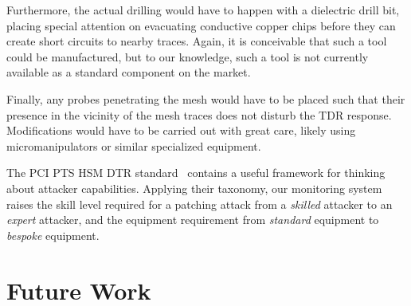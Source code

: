 \documentclass[final]{iacrtrans}
\newcommand{\partno}[1]{\textsf{\small#1}}
\begin{document}
Furthermore, the actual drilling would have to happen with a dielectric drill bit, placing special attention on
evacuating conductive copper chips before they can create short circuits to nearby traces. Again, it is conceivable that
such a tool could be manufactured, but to our knowledge, such a tool is not currently available as a standard component
on the market.

Finally, any probes penetrating the mesh would have to be placed such that their presence in the vicinity of the mesh
traces does not disturb the TDR response. Modifications would have to be carried out with great care, likely using
micromanipulators or similar specialized equipment.

The PCI PTS HSM DTR standard~\cite{pcisecuritystandardscouncilPaymentCardIndustry2021} contains a useful framework for
thinking about attacker capabilities. Applying their taxonomy, our monitoring system raises the skill level required for
a patching attack from a \emph{skilled} attacker to an \emph{expert} attacker, and the equipment requirement from
\emph{standard} equipment to \emph{bespoke} equipment.

\section{Future Work}


\end{document}
